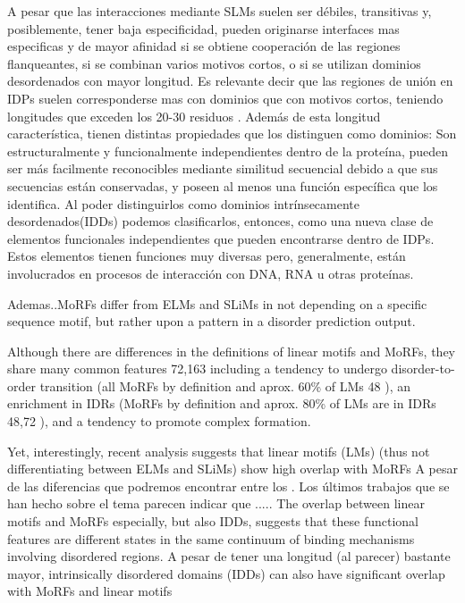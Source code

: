 A pesar que las interacciones mediante SLMs suelen ser débiles, transitivas y, posiblemente, tener baja especificidad, pueden originarse interfaces mas especificas y de mayor afinidad si 
se obtiene cooperación de las regiones flanqueantes, si se combinan varios motivos cortos, o si se utilizan dominios desordenados con mayor longitud.
Es relevante decir que las regiones de unión en IDPs suelen corresponderse mas con dominios que con motivos cortos, teniendo longitudes que exceden los 20-30 residuos
\cite{tompa2009close,chen2006conservation,chen2006conservationB}.  
Además de esta longitud característica, tienen distintas propiedades que los distinguen como dominios:
Son estructuralmente y funcionalmente independientes dentro de la proteína, pueden ser más facilmente reconocibles mediante similitud secuencial debido a que sus secuencias están conservadas, 
y poseen al menos una función específica que los identifica.
Al poder distinguirlos como dominios intrínsecamente desordenados(IDDs) podemos clasificarlos, entonces, como una nueva clase de elementos funcionales independientes que pueden encontrarse dentro de IDPs.
Estos elementos tienen funciones muy diversas pero, generalmente, están involucrados en procesos de interacción con DNA, RNA u otras proteínas.



% 


Ademas..MoRFs differ from ELMs and SLiMs in not depending on a specific sequence motif, but rather upon a pattern in a disorder prediction output. 

Although there are differences in the definitions of linear
motifs and MoRFs, they share many common features 72,163
including a tendency to undergo disorder-to-order transition (all
MoRFs by definition and aprox. 60\% of LMs 48 ), an enrichment in
IDRs (MoRFs by definition and aprox. 80\% of LMs are in IDRs 48,72 ),
and a tendency to promote complex formation.


Yet, interestingly, recent analysis suggests that linear motifs (LMs) (thus not differentiating between ELMs and SLiMs) show high overlap with MoRFs \cite{fuxreiter2007local}
A pesar de las diferencias que podremos encontrar entre los . Los últimos trabajos que se han hecho sobre el tema \cite{meszaros2012disordered, fuxreiter2007local} 
parecen indicar que .....
The overlap between linear motifs and MoRFs
especially, but also IDDs, suggests that these functional features
are different states in the same continuum of binding
mechanisms involving disordered regions.
A pesar de tener una longitud (al parecer) bastante mayor, intrinsically disordered domains (IDDs) can also have significant overlap with MoRFs and linear motifs

